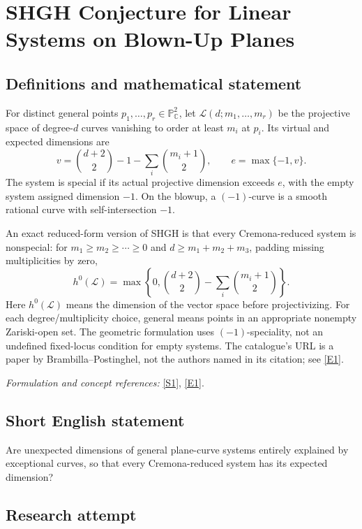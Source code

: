 \documentclass[11pt]{article}
\begin{document}
\section*{\texorpdfstring{SHGH Conjecture for Linear Systems on Blown-Up Planes}{SHGH Conjecture for Linear Systems on Blown-Up Planes}}\label{statement}
\subsection{Definitions and mathematical statement}
For distinct general points $p_1,\ldots,p_r\in{\mathbb{P}}^2_{{\mathbb{C}}}$, let $\mathcal L(d;m_1,\ldots,m_r)$ be the projective space of degree-$d$ curves vanishing to order at least $m_i$ at $p_i$. Its virtual and expected dimensions are
\[
 v=\binom{d+2}{2}-1-\sum_i\binom{m_i+1}{2},
 \qquad e=\max\{-1,v\}.
\]
The system is special if its actual projective dimension exceeds $e$, with the empty system assigned dimension $-1$. On the blowup, a $(-1)$-curve is a smooth rational curve with self-intersection $-1$.

An exact reduced-form version of SHGH is that every Cremona-reduced system is nonspecial: for $m_1\ge m_2\ge\cdots\ge0$ and $d\ge m_1+m_2+m_3$, padding missing multiplicities by zero,
\[
 h^0(\mathcal L)=\max\left\{0,\binom{d+2}{2}
                                  -\sum_i\binom{m_i+1}{2}\right\}.
\]
Here $h^0(\mathcal L)$ means the dimension of the vector space before projectivizing. For each degree/multiplicity choice, general means points in an appropriate nonempty Zariski-open set. The geometric formulation uses $(-1)$-speciality, not an undefined fixed-locus condition for empty systems. The catalogue's URL is a paper by Brambilla--Postinghel, not the authors named in its citation; see \href{https://link.springer.com/article/10.1007/s40574-025-00468-5}{[E1]}.
\par\smallskip\textit{Formulation and concept references:} \href{https://link.springer.com/article/10.1007/s40574-025-00468-5}{[S1]}, \href{https://link.springer.com/article/10.1007/s40574-025-00468-5}{[E1]}.

\subsection{Short English statement}
Are unexpected dimensions of general plane-curve systems entirely explained by exceptional curves, so that every Cremona-reduced system has its expected dimension?
\subsection{Research attempt}
\end{document}
